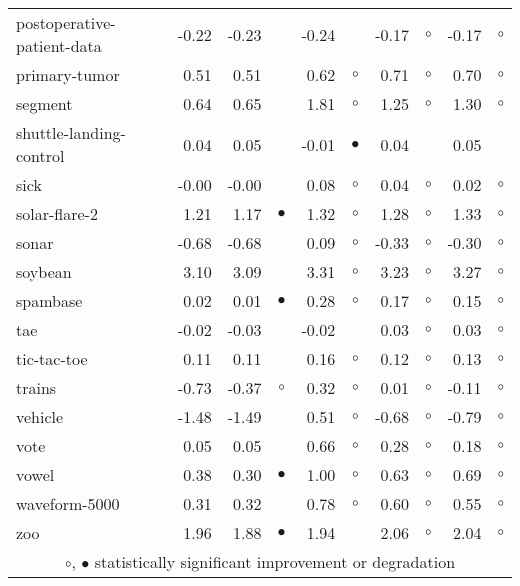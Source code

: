 {\begin{longtable}{lrr@{\hspace{0.1cm}}cr@{\hspace{0.1cm}}cr@{\hspace{0.1cm}}cr@{\hspace{0.1cm}}c}
postoperative-patient-data & -0.22 & -0.23 &           & -0.24 &           & -0.17 &   $\circ$ & -0.17 &   $\circ$\\
primary-tumor &  0.51 &  0.51 &           &  0.62 &   $\circ$ &  0.71 &   $\circ$ &  0.70 &   $\circ$\\
segment &  0.64 &  0.65 &           &  1.81 &   $\circ$ &  1.25 &   $\circ$ &  1.30 &   $\circ$\\
shuttle-landing-control &  0.04 &  0.05 &           & -0.01 & $\bullet$ &  0.04 &           &  0.05 &          \\
sick & -0.00 & -0.00 &           &  0.08 &   $\circ$ &  0.04 &   $\circ$ &  0.02 &   $\circ$\\
solar-flare-2 &  1.21 &  1.17 & $\bullet$ &  1.32 &   $\circ$ &  1.28 &   $\circ$ &  1.33 &   $\circ$\\
sonar & -0.68 & -0.68 &           &  0.09 &   $\circ$ & -0.33 &   $\circ$ & -0.30 &   $\circ$\\
soybean &  3.10 &  3.09 &           &  3.31 &   $\circ$ &  3.23 &   $\circ$ &  3.27 &   $\circ$\\
spambase &  0.02 &  0.01 & $\bullet$ &  0.28 &   $\circ$ &  0.17 &   $\circ$ &  0.15 &   $\circ$\\
tae & -0.02 & -0.03 &           & -0.02 &           &  0.03 &   $\circ$ &  0.03 &   $\circ$\\
tic-tac-toe &  0.11 &  0.11 &           &  0.16 &   $\circ$ &  0.12 &   $\circ$ &  0.13 &   $\circ$\\
trains & -0.73 & -0.37 &   $\circ$ &  0.32 &   $\circ$ &  0.01 &   $\circ$ & -0.11 &   $\circ$\\
vehicle & -1.48 & -1.49 &           &  0.51 &   $\circ$ & -0.68 &   $\circ$ & -0.79 &   $\circ$\\
vote &  0.05 &  0.05 &           &  0.66 &   $\circ$ &  0.28 &   $\circ$ &  0.18 &   $\circ$\\
vowel &  0.38 &  0.30 & $\bullet$ &  1.00 &   $\circ$ &  0.63 &   $\circ$ &  0.69 &   $\circ$\\
waveform-5000 &  0.31 &  0.32 &           &  0.78 &   $\circ$ &  0.60 &   $\circ$ &  0.55 &   $\circ$\\
zoo &  1.96 &  1.88 & $\bullet$ &  1.94 &           &  2.06 &   $\circ$ &  2.04 &   $\circ$\\
\hline
\multicolumn{10}{c}{$\circ$, $\bullet$ statistically significant improvement or degradation}\\
\end{longtable} \footnotesize \par}